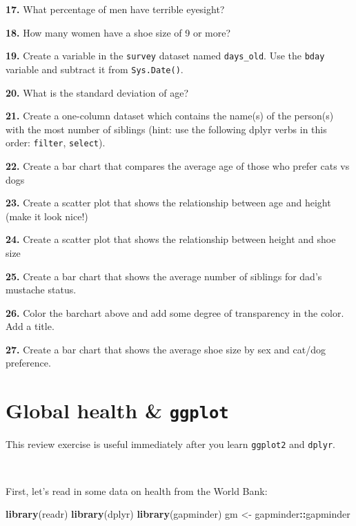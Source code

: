 \documentclass[
]{book}
\newenvironment{Shaded}{\begin{snugshade}}{\end{snugshade}}
\newcommand{\KeywordTok}[1]{\textcolor[rgb]{0.13,0.29,0.53}{\textbf{#1}}}
\newcommand{\NormalTok}[1]{#1}
\newcommand{\OperatorTok}[1]{\textcolor[rgb]{0.81,0.36,0.00}{\textbf{#1}}}
\newcommand{\StringTok}[1]{\textcolor[rgb]{0.31,0.60,0.02}{#1}}
\begin{document}
\textbf{17.} What percentage of men have terrible eyesight?

\textbf{18.} How many women have a shoe size of 9 or more?

\textbf{19.} Create a variable in the \texttt{survey} dataset named \texttt{days\_old}. Use the \texttt{bday} variable and subtract it from \texttt{Sys.Date()}.

\textbf{20.} What is the standard deviation of age?

\textbf{21.} Create a one-column dataset which contains the name(s) of the person(s) with the most number of siblings (hint: use the following dplyr verbs in this order: \texttt{filter}, \texttt{select}).

\textbf{22.} Create a bar chart that compares the average age of those who prefer cats vs dogs

\textbf{23.} Create a scatter plot that shows the relationship between age and height (make it look nice!)

\textbf{24.} Create a scatter plot that shows the relationship between height and shoe size

\textbf{25.} Create a bar chart that shows the average number of siblings for dad's mustache status.

\textbf{26.} Color the barchart above and add some degree of transparency in the color. Add a title.

\textbf{27.} Create a bar chart that shows the average shoe size by sex and cat/dog preference.

\hypertarget{global-health-ggplot}{%
\chapter{\texorpdfstring{Global health \& \texttt{ggplot}}{Global health \& ggplot}}\label{global-health-ggplot}}

This review exercise is useful immediately after you learn \texttt{ggplot2} and \texttt{dplyr}.

~

First, let's read in some data on health from the World Bank:

\begin{Shaded}
\begin{Highlighting}[]
\KeywordTok{library}\NormalTok{(readr)}
\KeywordTok{library}\NormalTok{(dplyr)}
\KeywordTok{library}\NormalTok{(gapminder)}
\NormalTok{gm <-}\StringTok{ }\NormalTok{gapminder}\OperatorTok{::}\NormalTok{gapminder}
\end{Highlighting}
\end{Shaded}
\end{document}
